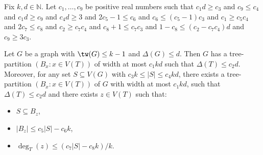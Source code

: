 


\begin{lem}
Fix $k,d\in\mathbb{N}$. 
Let $c_1,\dots,c_9$ be positive real numbers such that $c_1d \geq c_3$ and $c_9\leq c_4$ and $c_1d\geq c_9$ and $c_4 d\geq 3$ and $2 c_5-1 \leq c_6 $ and $c_6 \leq (c_5-1) c_3$ and $c_1\geq c_5c_4$ and $2c_7  \leq  c_8$ and $c_2 \geq c_7c_4$ and $c_8+1 \leq c_7 c_3  $ and $1- c_8  \leq (c_2-c_7 c_4)d$ and $ c_9 \geq 3c_3$. 


Let $G$ be a graph with $\tw(G)\leq k-1$ and $\Delta(G)\leq d$.
Then $G$ has a tree-partition $(B_x:x\in V(T))$ of width at most $c_1kd$ such that $\Delta(T)\leq c_2 d$. 
Moreover, for any set $S\subseteq V(G)$ with $c_3 k\leq|S| \leq c_4 kd$, there exists a tree-partition $(B_x:x\in V(T))$ of $G$ with width at most $c_1 kd$, such that $\Delta(T)\leq c_2d$ and there exists $z\in V(T)$ such that:
\begin{itemize}
    \item $S\subseteq B_z$, 
    \item $|B_z|\leq c_5|S|-c_6k$,
    \item $\deg_T(z)\leq ( c_7 |S| - c_8 k)/k$.
\end{itemize}
\end{lem}


